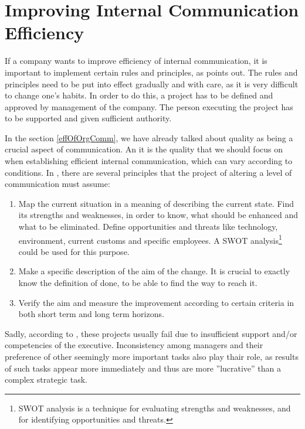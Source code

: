 \documentclass[11pt,singleside]{myfithesis2}
\begin{document}
	\section{Improving Internal Communication Efficiency}\label{improvingEff}
If a company wants to improve efficiency of internal communication, it is important to implement certain rules and principles, as \cite{intCommManag} points out. The rules and principles need to be put into effect gradually and with care, as it is very difficult to change one's habits. In order to do this, a project has to be defined and approved by management of the company. The person executing the project has to be supported and given sufficient authority. 

In the section \ref{effOfOrgComm}, we have already talked about quality as being a crucial aspect of communication. An it is the quality that we should focus on when establishing efficient internal communication, which can vary according to conditions. In \cite{intCommManag}, there are several principles that the project of altering a level of communication must assume:
\begin{enumerate}
	\item Map the current situation in a meaning of describing the current state. Find its strengths and weaknesses, in order to know, what should be enhanced and what to be eliminated. Define opportunities and threats like technology, environment, current customs and specific employees. A SWOT analysis\footnote{SWOT analysis is a technique for evaluating strengths and weaknesses, and for identifying opportunities and threats.} could be used for this purpose.
	\item Make a specific description of the aim of the change. It is crucial to exactly know the definition of done, to be able to find the way to reach it.
	\item Verify the aim and measure the improvement according to certain criteria in both short term and long term horizons.
\end{enumerate}

Sadly, according to \cite{intCommManag}, these projects usually fail due to insufficient support and/or competencies of the executive. Inconsistency among managers and their preference of other seemingly more important tasks also play thair role, as results of such tasks appear more immediately and thus are more ''lucrative'' than a complex strategic task.
\end{document}
